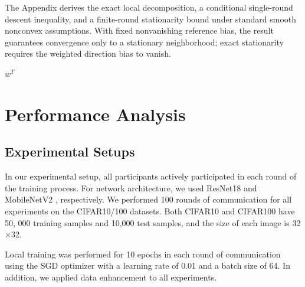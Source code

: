 \documentclass[journal,twoside,web]{ieeecolor}
\begin{document}
The Appendix derives the exact local decomposition, a conditional single-round descent inequality, and a finite-round stationarity bound under standard smooth nonconvex assumptions. With fixed nonvanishing reference bias, the result guarantees convergence only to a stationary neighborhood; exact stationarity requires the weighted direction bias to vanish.




\begin{algorithm}[h]
\SetAlgoLined
\caption{FCPC (Proposed Framework)}
\label{alg:FCPC}

\Return $w^T$
\end{algorithm}




\section{Performance Analysis}

\subsection{Experimental Setups}
In our experimental setup, all participants actively participated in each round of the training process. For network architecture, we used ResNet18\cite{resnet} and MobileNetV2 \cite{mobilenetv2}, respectively. We performed 100 rounds of communication for all experiments on the CIFAR10/100\cite{cifar10} datasets. Both CIFAR10 and CIFAR100 have 50, 000 training samples and 10,000 test samples, and the size of each image is 32$\times$32. 

Local training was performed for 10 epochs in each round of communication using the SGD optimizer with a learning rate of 0.01 and a batch size of 64. In addition, we applied data enhancement to all experiments.
\end{document}
